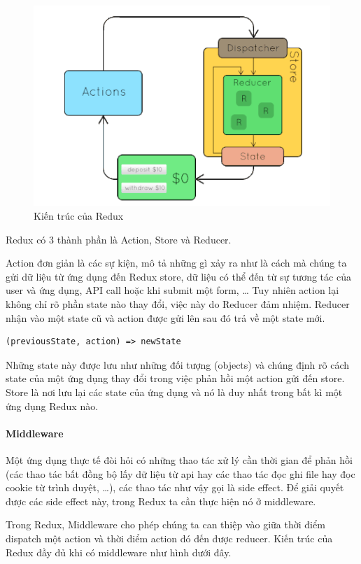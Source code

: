 \begin{figure}[H]
\centering
\includegraphics[width=12cm]{images/redux-without-middleware.png}
\caption{Kiến trúc của Redux}
\end{figure}

Redux có 3 thành phần là Action, Store và Reducer.

Action đơn giản là các sự kiện, mô tả những gì xảy ra như 
là cách mà chúng ta gửi dữ liệu từ ứng dụng đến Redux store, 
dữ liệu có thể đến từ sự tương tác của user và ứng dụng, 
API call hoặc khi submit một form, … Tuy nhiên action lại không 
chỉ rõ phần state nào thay đổi, việc này do Reducer đảm nhiệm. 
Reducer nhận vào một state cũ và action được gửi lên 
sau đó trả về một state mới. 

\begin{lstlisting}
(previousState, action) => newState
\end{lstlisting}

Những state này được lưu như những đối tượng (objects) và
chúng định rõ cách state của một ứng dụng thay đổi trong việc
phản hồi một action gửi đến store. Store là nơi lưu lại các
state của ứng dụng và nó là duy nhất
trong bất kì một ứng dụng Redux nào.

\paragraph{Middleware}
Một ứng dụng thực tế đòi hỏi có những thao tác xử lý cần thời
gian để phản hồi (các thao tác bất đồng bộ lấy dữ liệu từ
api hay các thao tác đọc ghi file hay đọc cookie từ trình duyệt, …),
các thao tác như vậy gọi là side effect. Để giải quyết được
các side effect này, trong Redux ta cần thực hiện nó ở middleware.

Trong Redux, Middleware cho phép chúng ta can thiệp vào giữa
thời điểm dispatch một action và thời điểm action đó đến được
reducer. Kiến trúc của Redux đầy đủ khi có middleware như hình dưới đây.


